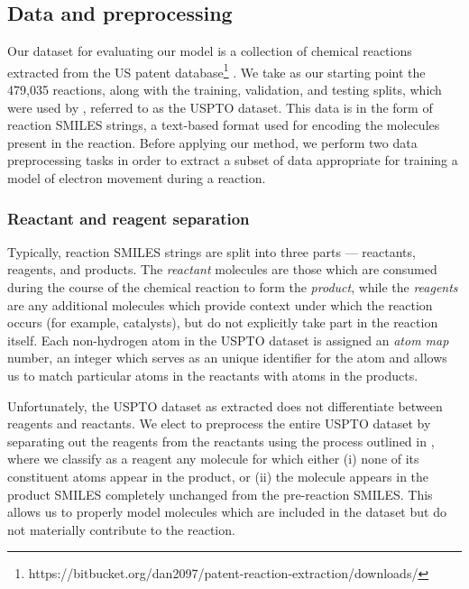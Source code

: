 
\subsection{Data and preprocessing}

Our dataset for evaluating our model is a collection of chemical reactions extracted from the US patent database\footnote{https://bitbucket.org/dan2097/patent-reaction-extraction/downloads/} .
We take as our starting point the 479,035 reactions, along with the training, validation, and testing splits, 
which were used by \citet{jin2017predicting}, referred to as the USPTO dataset.
This data is in the form of reaction SMILES strings, a text-based format used for encoding the molecules present in the reaction.
Before applying our method, we perform two data preprocessing tasks in order to extract a subset of data appropriate for training a model of electron movement during a reaction.

\subsubsection{Reactant and reagent separation}

Typically, reaction SMILES strings are split into three parts --- reactants, reagents, and products.
The {\em reactant} molecules are those which are consumed during the course of the chemical reaction to form the {\em product}, 
while the {\em reagents} are any additional molecules which provide context under which the reaction occurs (for example, catalysts),
but do not explicitly take part in the reaction  itself.
Each non-hydrogen atom in the USPTO dataset is assigned an {\em atom map} number, an integer which serves as an unique identifier for the atom and allows us to match particular atoms in the reactants with atoms in the products.

Unfortunately, the USPTO dataset as extracted does not differentiate between reagents and reactants.
We elect to preprocess the entire USPTO dataset by separating out the reagents from the reactants using the process outlined in \citet{schwaller2017found}, where we classify as a reagent any molecule for which either 
(i) none of its constituent atoms appear in the product, or 
(ii) the molecule appears in the product SMILES completely unchanged from the pre-reaction SMILES.
This allows us to properly model molecules which are included in the dataset but do not materially contribute to the reaction.

